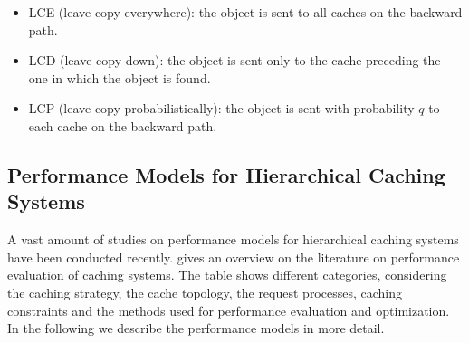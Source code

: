 \begin{itemize}
  \item LCE (leave-copy-everywhere): the object is sent to all caches on the backward path.
  \item LCD (leave-copy-down): the object is sent only to the cache preceding the one in which the object is found.
  \item LCP (leave-copy-probabilistically): the object is sent with probability $q$ to each cache on the backward path.
\end{itemize}

\subsection{Performance Models for Hierarchical Caching Systems}\label{sec:hierarchical:background:models}

A vast amount of studies on performance models for hierarchical caching systems have been conducted recently.
 gives an overview on the literature on performance evaluation of caching systems.
The table shows different categories, considering the caching strategy, the cache topology, the request processes, caching constraints and the methods used for performance evaluation and optimization.
In the following we describe the performance models in more detail.

